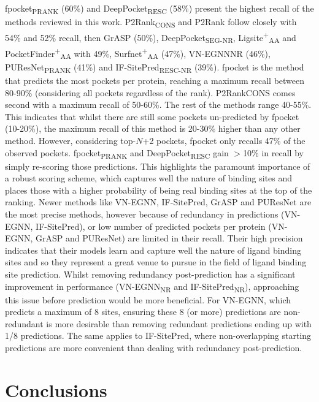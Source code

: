 fpocket\textsubscript{PRANK} (60\%) and DeepPocket\textsubscript{RESC} (58\%) present the highest recall of the methods reviewed in this work. P2Rank\textsubscript{CONS} and P2Rank follow closely with 54\% and 52\% recall, then GrASP (50\%), DeepPocket\textsubscript{SEG-NR}, Ligsite\textsuperscript{+}\textsubscript{AA} and PocketFinder\textsuperscript{+}\textsubscript{AA} with 49\%, Surfnet\textsuperscript{+}\textsubscript{AA} (47\%), VN-EGNNNR (46\%), PUResNet\textsubscript{PRANK} (41\%) and IF-SitePred\textsubscript{RESC-NR} (39\%). fpocket is the method that predicts the most pockets per protein, reaching a maximum recall between 80-90\% (considering all pockets regardless of the rank). P2RankCONS comes second with a maximum recall of 50-60\%. The rest of the methods range 40-55\%. This indicates that whilst there are still some pockets un-predicted by fpocket (10-20\%), the maximum recall of this method is 20-30\% higher than any other method. However, considering top-$N$+2 pockets, fpocket only recalls 47\% of the observed pockets. fpocket\textsubscript{PRANK} and DeepPocket\textsubscript{RESC} gain $>$10\% in recall by simply re-scoring those predictions. This highlights the paramount importance of a robust scoring scheme, which captures well the nature of binding sites and places those with a higher probability of being real binding sites at the top of the ranking. Newer methods like VN-EGNN, IF-SitePred, GrASP and PUResNet are the most precise methods, however because of redundancy in predictions (VN-EGNN, IF-SitePred), or low number of predicted pockets per protein (VN-EGNN, GrASP and PUResNet) are limited in their recall. Their high precision indicates that their models learn and capture well the nature of ligand binding sites and so they represent a great venue to pursue in the field of ligand binding site prediction. Whilst removing redundancy post-prediction has a significant improvement in performance (VN-EGNN\textsubscript{NR} and IF-SitePred\textsubscript{NR}), approaching this issue before prediction would be more beneficial. For VN-EGNN, which predicts a maximum of 8 sites, ensuring these 8 (or more) predictions are non-redundant is more desirable than removing redundant predictions ending up with 1/8 predictions. The same applies to IF-SitePred, where non-overlapping starting predictions are more convenient than dealing with redundancy post-prediction.

\section{Conclusions}

